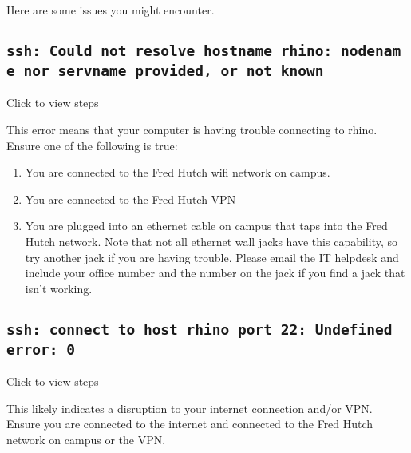 \documentclass[
]{book}
\providecommand{\tightlist}{%
  \setlength{\itemsep}{0pt}\setlength{\parskip}{0pt}}
\begin{document}
Here are some issues you might encounter.

\hypertarget{ssh-could-not-resolve-hostname-rhino-nodename-nor-servname-provided-or-not-known}{%
\subsection*{\texorpdfstring{\texttt{ssh:\ Could\ not\ resolve\ hostname\ rhino:\ nodename\ nor\ servname\ provided,\ or\ not\ known}}{ssh: Could not resolve hostname rhino: nodename nor servname provided, or not known}}\label{ssh-could-not-resolve-hostname-rhino-nodename-nor-servname-provided-or-not-known}}

Click to view steps

This error means that your computer is having trouble connecting to rhino. Ensure one of the following is true:

\begin{enumerate}
\def\labelenumi{\arabic{enumi}.}
\tightlist
\item
  You are connected to the Fred Hutch wifi network on campus.
\item
  You are connected to the Fred Hutch VPN
\item
  You are plugged into an ethernet cable on campus that taps into the Fred Hutch network. Note that not all ethernet wall jacks have this capability, so try another jack if you are having trouble. Please email the IT helpdesk and include your office number and the number on the jack if you find a jack that isn't working.
\end{enumerate}

\hypertarget{ssh-connect-to-host-rhino-port-22-undefined-error-0}{%
\subsection*{\texorpdfstring{\texttt{ssh:\ connect\ to\ host\ rhino\ port\ 22:\ Undefined\ error:\ 0}}{ssh: connect to host rhino port 22: Undefined error: 0}}\label{ssh-connect-to-host-rhino-port-22-undefined-error-0}}

Click to view steps

This likely indicates a disruption to your internet connection and/or VPN. Ensure you are connected to the internet and connected to the Fred Hutch network on campus or the VPN.
\end{document}
